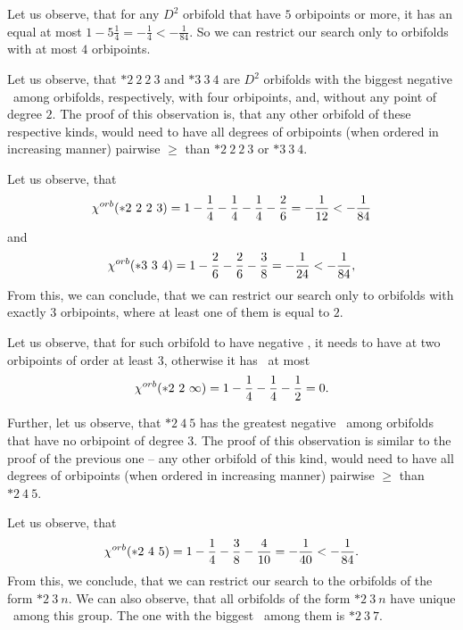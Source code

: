 Let us observe, that for any $D^2$ orbifold that have $5$ orbipoints or more, it has an \Eoc 
equal at most $1 - 5\frac{1}{4} = -\frac{1}{4} < -\frac{1}{84}$. So we can restrict our search 
only to orbifolds with at most $4$ orbipoints. 

Let us observe, that $*2\ 2\ 2\ 3$ and $* 3\ 3\ 4$ are $D^2$ orbifolds with the biggest 
negative \Eoc\ among orbifolds, respectively, with four orbipoints, and, without any 
point of degree $2$. The proof of this observation is, that any other orbifold of these 
respective kinds, would need to have all degrees of orbipoints (when ordered in increasing manner) 
pairwise $\geq$ than $*2\ 2\ 2\ 3$ or $* 3\ 3\ 4$.

Let us observe, that 
\begin{equation}
{\chi^{orb}(*2\ 2\ 2\ 3)} = 1 - \frac{1}{4} - \frac{1}{4} - \frac{1}{4} - \frac{2}{6} = -\frac{1}{12} 
< -\frac{1}{84}
\end{equation}
and
\begin{equation}
\cho{*3\ 3\ 4} = 1 - \frac{2}{6} - \frac{2}{6} - \frac{3}{8} = -\frac{1}{24} < -\frac{1}{84},
\end{equation}
From this, we can conclude, that we can restrict our search only to orbifolds with 
exactly $3$ orbipoints, where at least one of them is equal to $2$. 

Let us observe, that for such orbifold to have negative \Eoc, it needs to have at two orbipoints 
of order at least $3$, otherwise it has \Eoc\ at most 
\begin{equation}
\cho{*2\ 2\ \infty} = 1- \frac{1}{4} - \frac{1}{4} - \frac{1}{2} = 0. 
\end{equation}

Further, let us observe, that $*2\ 4\ 5$ has the greatest negative \Eoc\ among orbifolds 
that have no orbipoint of degree $3$. The proof of this observation is similar to the proof 
of the previous one -- any other orbifold of this kind, 
would need to have all degrees of orbipoints (when ordered in increasing manner) 
pairwise $\geq$ than $*2\ 4\ 5$.

Let us observe, that
\begin{equation}
{\chi^{orb}(*2\ 4\ 5)} = 1 - \frac{1}{4} - \frac{3}{8} - \frac{4}{10} = -\frac{1}{40} < - \frac{1}{84}. 
\end{equation}
From this, we conclude, that we can restrict our search to the orbifolds of 
the form $*2\ 3\ n$. 
We can also observe, that all orbifolds of the form $*2\ 3\ n$ have unique \Eoc\ 
among this group.
The one with the biggest \Eoc\ among them is $*2\ 3\ 7$. 

